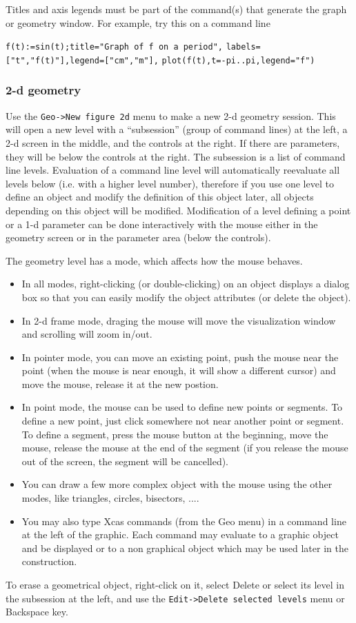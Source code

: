\documentclass{article}
\begin{document}
Titles and axis legends must be part of the command(s) that generate
the graph or geometry window. For example, try this on a command line
\begin{center}
\verb|f(t):=sin(t);title="Graph of f on a period",|
\verb|labels=["t","f(t)"],legend=["cm","m"],|
\verb|plot(f(t),t=-pi..pi,legend="f")|
\end{center}

\subsubsection{2-d geometry}
Use the \verb|Geo->New figure 2d| menu to make a new 2-d geometry
session. This will open a new level with a ``subsession'' (group of
command lines) at the left,
a 2-d screen in the middle, and the controls at the right. If there
are parameters, they will be below the controls at the right.
The subsession is a list of command line levels. Evaluation of
a command line level will automatically reevaluate all levels
below (i.e. with a higher level number), therefore if you use
one level to define an object and modify the definition of this
object later, all objects depending on this object will be modified.
Modification of a level defining a point or a 1-d parameter can be
done interactively with the mouse either in the geometry screen or in the
parameter area (below the controls).

The geometry level has a mode, which affects how the mouse behaves.
\begin{itemize}
\item In all modes, right-clicking (or double-clicking) on an object
displays a dialog box so that you can easily modify the object
attributes (or delete the object).
\item In 2-d frame mode, draging the mouse will move the visualization window
and scrolling will zoom in/out.
\item In pointer mode, you can move an existing point, push the mouse 
near the point (when the mouse is near enough, it will show
a different cursor) and move the mouse, release it at the
new postion.
\item In point mode, the mouse can be used to define new
points or segments. To define a new
point, just click somewhere not near another point or segment. To
define a segment, press the mouse button at the beginning, move
the mouse, release the mouse at the end of the segment (if
you release the mouse out of the screen, the segment will be
cancelled). 
\item You can draw a few more complex object with the mouse using
the other modes, like triangles, circles, bisectors, .... 
\item You may also type Xcas commands (from the Geo menu)
in a command line at the left of the graphic. Each command may evaluate
to a graphic object and be displayed or to a non graphical object which
may be used later in the construction.
\end{itemize}
To erase a geometrical object, right-click on it, select Delete
or select its level in the
subsession at the left, and use the \verb|Edit->Delete selected levels|
menu or Backspace key.
\end{document}

